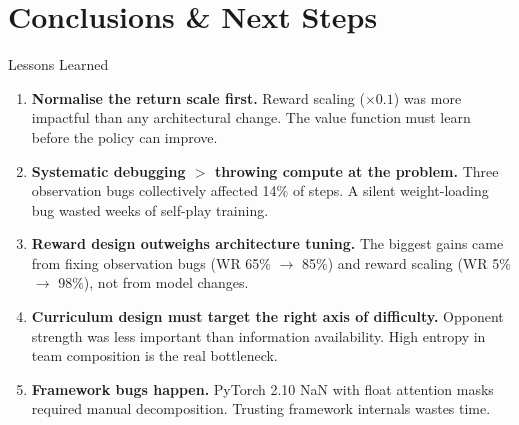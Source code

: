 \documentclass[aspectratio=169, 11pt]{beamer}
\begin{document}
\section{Conclusions \& Next Steps}

\begin{frame}{Lessons Learned}
  \begin{enumerate}\setlength{\itemsep}{0.5em}
    \item \textbf{Normalise the return scale first.}
          Reward scaling ($\times 0.1$) was more impactful than any
          architectural change. The value function must learn before the
          policy can improve.

    \item \textbf{Systematic debugging $>$ throwing compute at the problem.}
          Three observation bugs collectively affected 14\% of steps.
          A silent weight-loading bug wasted weeks of self-play training.

    \item \textbf{Reward design outweighs architecture tuning.}
          The biggest gains came from fixing observation bugs (WR 65\%
          $\to$ 85\%) and reward scaling (WR 5\% $\to$ 98\%), not from
          model changes.

    \item \textbf{Curriculum design must target the right axis of difficulty.}
          Opponent strength was less important than information availability.
          High entropy in team composition is the real bottleneck.

    \item \textbf{Framework bugs happen.}
          PyTorch 2.10 NaN with float attention masks required manual
          decomposition. Trusting framework internals wastes time.
  \end{enumerate}
\end{frame}
\end{document}
